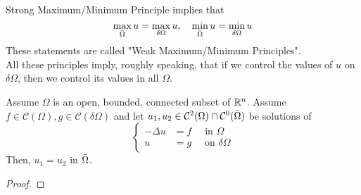 \begin{remark}
    Strong Maximum/Minimum Principle implies that 
    \begin{equation*}
        \max_{\Bar{\Omega}} u = \max_{\delta \Omega} u, \quad \min_{\Bar{\Omega}} u = \min_{\delta \Omega} u
    \end{equation*}
    These statements are called "Weak Maximum/Minimum Principles". \\
    All these principles imply, roughly speaking, that if we control the values of $u$ on $\delta \Omega$, then we control its values in all $\Omega$. 
\end{remark}
\begin{ThBox}
    \begin{Th}
        Assume $\Omega$ is an open, bounded, connected subset of $\mathbb{R}^n$. Assume $f \in \mathcal{C}(\Omega), g \in \mathcal{C}(\delta \Omega)$ and let $u_1, u_2 \in \mathcal{C}^2(\Omega) \cap \mathcal{C}^0(\Bar{\Omega})$ be solutions of 
        \begin{equation*}
            \begin{cases}
                - \Delta u &= f \quad \text{ in } \Omega\\
                 u &= g \quad \text{ on } \delta \Omega
            \end{cases}
        \end{equation*}
        Then, $u_1 = u_2$ in $\Bar{\Omega}$. 
    \end{Th}
\end{ThBox}
\begin{ProofBox}
    \begin{proof}
        
    \end{proof}
\end{ProofBox}
